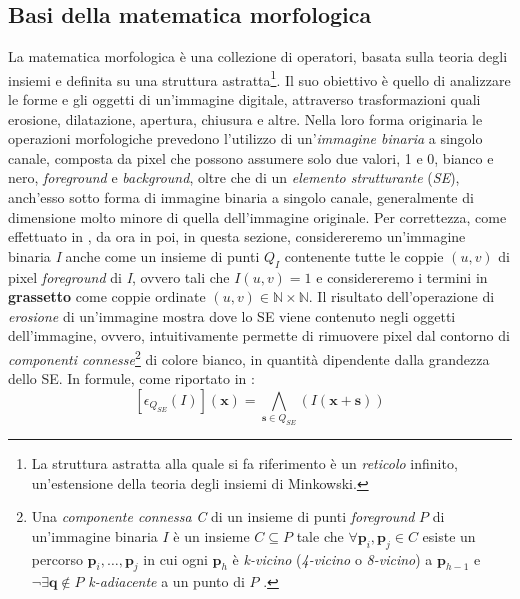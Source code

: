 \subsection{Basi della matematica morfologica}
\label{subsec:math-morph-basis}
La matematica morfologica \`e una collezione di operatori, basata sulla teoria degli insiemi e definita su una struttura astratta\footnote{La struttura astratta alla quale si fa riferimento \`e un \textit{reticolo} infinito, un'estensione della teoria degli insiemi di Minkowski.}. Il suo obiettivo \`e quello di analizzare le forme e gli oggetti di un'immagine digitale, attraverso trasformazioni quali erosione, dilatazione, apertura, chiusura e altre. Nella loro forma originaria le operazioni morfologiche prevedono l'utilizzo di un'\textit{immagine binaria} a singolo canale, composta da pixel che possono assumere solo due valori, 1 e 0, bianco e nero, \textit{foreground} e \textit{background}, oltre che di un \textit{elemento strutturante} (\textit{SE}), anch'esso sotto forma di immagine binaria a singolo canale, generalmente di dimensione molto minore di quella dell'immagine originale. Per correttezza, come effettuato in \cite{bib:digital-image-processing}, da ora in poi, in questa sezione, considereremo un'immagine binaria \textit{I} anche come un insieme di punti $Q_{I}$ contenente tutte le coppie $(u,v)$ di pixel \textit{foreground} di \textit{I}, ovvero tali che $I(u, v) = 1$ e considereremo i termini in \textbf{grassetto} come coppie ordinate $(u,v) \in \mathbb{N}\times\mathbb{N}$.
\newpage
Il risultato dell'operazione di \textit{erosione} di un'immagine mostra dove lo SE viene contenuto negli oggetti dell'immagine, ovvero, intuitivamente permette di rimuovere pixel dal contorno di \textit{componenti connesse}\footnote{Una \textit{componente connessa} \textit{C} di un insieme di punti \textit{foreground} $P$ di un'immagine binaria $I$ \`e un insieme $C\subseteq P$ tale che $\forall \textbf{p}_{i}, \textbf{p}_{j} \in C$ esiste un percorso $\textbf{p}_{i}, \dots, \textbf{p}_{j}$ in cui ogni $\textbf{p}_{h}$ \`e \textit{k-vicino} (\textit{4-vicino} o \textit{8-vicino}) a $\textbf{p}_{h-1}$ e $\neg \exists \textbf{q}\notin P$ \textit{k-adiacente} a un punto di $P$ \cite{bib:binary-images-connectivity}.} di colore bianco, in quantit\`a dipendente dalla grandezza dello SE. In formule, come riportato in \cite{bib:top-hat-paper}:
\begin{equation}
	\label{eq:erosion}
	[\epsilon_{Q_{SE}}(I)](\textbf{x}) = \underset{\textbf{s}\in Q_{SE}}{\bigwedge}(I(\textbf{x}+\textbf{s}))
\end{equation}\par
